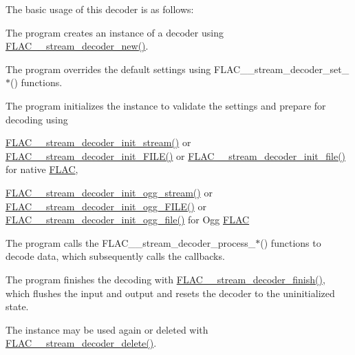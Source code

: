 The basic usage of this decoder is as follows\+:
\begin{DoxyItemize}
\item The program creates an instance of a decoder using \hyperlink{group__flac__stream__decoder_ga7159eefc074dfbab4a37462f69326091}{F\+L\+A\+C\+\_\+\+\_\+stream\+\_\+decoder\+\_\+new()}.
\item The program overrides the default settings using F\+L\+A\+C\+\_\+\+\_\+stream\+\_\+decoder\+\_\+set\+\_\+$\ast$() functions.
\item The program initializes the instance to validate the settings and prepare for decoding using
\begin{DoxyItemize}
\item \hyperlink{group__flac__stream__decoder_ga32c28a56a2bdfa2333edbd3d991894d7}{F\+L\+A\+C\+\_\+\+\_\+stream\+\_\+decoder\+\_\+init\+\_\+stream()} or \hyperlink{group__flac__stream__decoder_ga38f9eb46bf112af205f86b4cbac9980c}{F\+L\+A\+C\+\_\+\+\_\+stream\+\_\+decoder\+\_\+init\+\_\+\+F\+I\+L\+E()} or \hyperlink{group__flac__stream__decoder_ga1692108a97012d1c5f79baf7df012c33}{F\+L\+A\+C\+\_\+\+\_\+stream\+\_\+decoder\+\_\+init\+\_\+file()} for native \hyperlink{namespace_f_l_a_c}{F\+L\+AC},
\item \hyperlink{group__flac__stream__decoder_ga78bf285b54e5aaee73a214c108683a72}{F\+L\+A\+C\+\_\+\+\_\+stream\+\_\+decoder\+\_\+init\+\_\+ogg\+\_\+stream()} or \hyperlink{group__flac__stream__decoder_gac6a35b1db07e057ec9912f637b37dd74}{F\+L\+A\+C\+\_\+\+\_\+stream\+\_\+decoder\+\_\+init\+\_\+ogg\+\_\+\+F\+I\+L\+E()} or \hyperlink{group__flac__stream__decoder_ga609f2a43987d6abeaef654575462030c}{F\+L\+A\+C\+\_\+\+\_\+stream\+\_\+decoder\+\_\+init\+\_\+ogg\+\_\+file()} for Ogg \hyperlink{namespace_f_l_a_c}{F\+L\+AC}
\end{DoxyItemize}
\item The program calls the F\+L\+A\+C\+\_\+\+\_\+stream\+\_\+decoder\+\_\+process\+\_\+$\ast$() functions to decode data, which subsequently calls the callbacks.
\item The program finishes the decoding with \hyperlink{group__flac__stream__decoder_gaa51bb38f762ee11b320a0839f165c5ce}{F\+L\+A\+C\+\_\+\+\_\+stream\+\_\+decoder\+\_\+finish()}, which flushes the input and output and resets the decoder to the uninitialized state.
\item The instance may be used again or deleted with \hyperlink{group__flac__stream__decoder_gab958ee28b829be37e541946676ad9677}{F\+L\+A\+C\+\_\+\+\_\+stream\+\_\+decoder\+\_\+delete()}.
\end{DoxyItemize}

